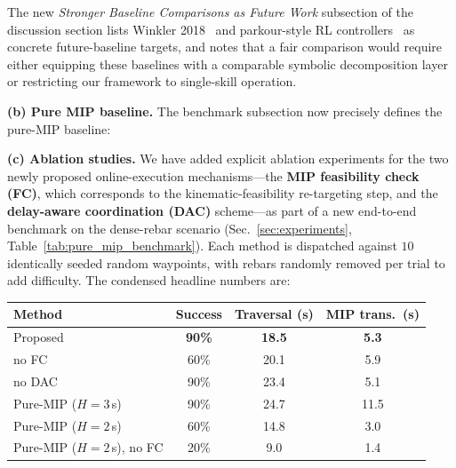 The new \textit{Stronger Baseline Comparisons as Future Work} subsection of the discussion section lists Winkler 2018~\citep{winkler2018gait} and parkour-style RL controllers~\citep{zhuang2023robot,hoeller2023anymal,cheng2024extreme,luo2024pie} as concrete future-baseline targets, and notes that a fair comparison would require either equipping these baselines with a comparable symbolic decomposition layer or restricting our framework to single-skill operation.

\textbf{(b) Pure MIP baseline.} The benchmark subsection now precisely defines the pure-MIP baseline:

\textit{}

\textbf{(c) Ablation studies.} We have added explicit ablation experiments for the two newly proposed online-execution mechanisms---the \textbf{MIP feasibility check (FC)}, which corresponds to the kinematic-feasibility re-targeting step, and the \textbf{delay-aware coordination (DAC)} scheme---as part of a new end-to-end benchmark on the dense-rebar scenario (Sec.~\ref{sec:experiments}, Table~\ref{tab:pure_mip_benchmark}). Each method is dispatched against $10$ identically seeded random waypoints, with rebars randomly removed per trial to add difficulty. The condensed headline numbers are:

\begin{center}\footnotesize
\setlength{\tabcolsep}{3pt}
\begin{tabular}{lccc}
\hline
\textbf{Method} & \textbf{Success} & \textbf{Traversal (s)} & \textbf{MIP trans.\ (s)} \\
\hline
Proposed                       & \textbf{90\%} & \textbf{18.5} & \textbf{5.3} \\
\quad no FC                    & 60\%          & 20.1          & 5.9 \\
\quad no DAC                   & 90\%          & 23.4          & 5.1 \\
Pure-MIP ($H{=}3$\,s)          & 90\%          & 24.7          & 11.5 \\
Pure-MIP ($H{=}2$\,s)          & 60\%          & 14.8          & 3.0 \\
Pure-MIP ($H{=}2$\,s), no FC   & 20\%          & 9.0           & 1.4 \\
\hline
\end{tabular}
\end{center}


